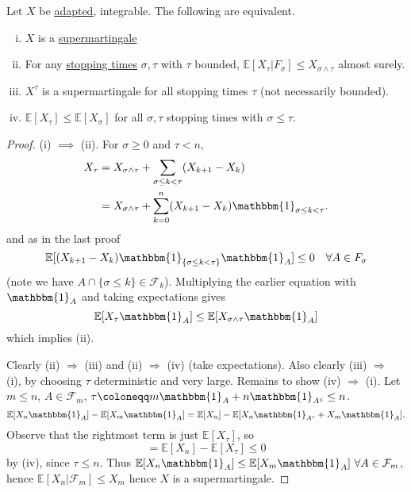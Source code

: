 \documentclass{article}
\newcommand{\F}{\mathcal{F}}
\newcommand{\1}[1]{\mathbbm{1}_{#1}}
\newcommand{\E}{\mathbb{E}}
\begin{document}
\begin{nthm}
  Let $X$ be \hyperlink{def:adapted}{adapted}, integrable. The following are equivalent.
  \begin{enumerate}[(i)]
    \item $X$ is a \hyperlink{def:martingale}{supermartingale}
    \item For any \hyperlink{def:stopping}{stopping times} $\sigma,\tau$ with $\tau$ bounded, $\E[X_\tau | F_\sigma] \leq X_{\sigma \wedge \tau}$ almost surely.
    \item $X^\tau$ is a supermartingale for all stopping times $\tau$ (not necessarily bounded).
    \item $\E[X_\tau] \leq \E[X_\sigma]$ for all $\sigma,\tau$ stopping times with $\sigma \leq \tau$.
  \end{enumerate}
\end{nthm}
\begin{proof}
  (i) $\implies$ (ii). For $\sigma \geq 0$ and $\tau < n$,
  \begin{align*}
    X_\tau &= X_{\sigma \wedge \tau} + \sum_{\sigma \leq k < \tau} (X_{k+1} - X_k)  \\
           &= X_{\sigma \wedge \tau} + \sum_{k=0}^n (X_{k+1} - X_k) \1{\sigma \leq k < \tau}.
  \end{align*}
  and as in the last proof
  \begin{equation*}
    \E[(X_{k+1} - X_k) \1{\{\sigma \leq k < \tau\}} \1A] \leq 0 \quad \forall A \in F_\sigma
  \end{equation*}
  (note we have $A \cap \{\sigma \leq k\} \in \F_k$).
  Multiplying the earlier equation with $\1A$ and taking expectations gives
  \begin{equation*}
    \E[X_\tau \1A] \leq \E[X_{\sigma \wedge \tau} \1A]
  \end{equation*}
  which implies (ii).

  \newlec
  Clearly (ii) $\Rightarrow$ (iii) and (ii) $\Rightarrow$ (iv) (take expectations).
  Also clearly (iii) $\Rightarrow$ (i), by choosing $\tau$ deterministic and very large.
  Remains to show (iv) $\Rightarrow$ (i).
  Let $m \leq n$, $A \in \F_m$, $\tau \coloneqq m \1A + n \1{A^c} \leq n$.
  \begin{equation*}
    \E[X_n \1A] - \E[X_m \1A] = \E[X_n] - \E[X_n \1{A^c} + X_m \1A]
  .\end{equation*}
  Observe that the rightmost term is just $\E[X_\tau]$, so
  \begin{equation*}
    = \E[X_n] - \E[X_\tau] \leq 0
  \end{equation*}
  by (iv), since $\tau \leq n$.
  Thus $\E[X_n \1A] \leq \E[X_m \1A]\ \forall A \in \F_m$, hence $\E[X_n | \F_m] \leq X_m$ hence $X$ is a supermartingale.
\end{proof}
\end{document}

